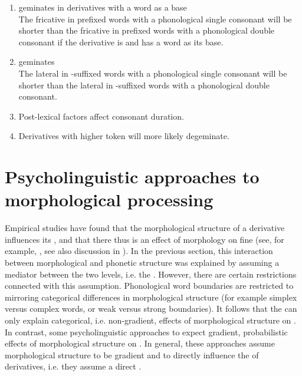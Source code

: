 \begin{description}
\begin{enumerate}[leftmargin=*]
	\item {} geminates in  derivatives with a word as a base \\
	The fricative in prefixed words with a phonological single consonant will be shorter than the fricative in prefixed words with a phonological double consonant if  the derivative is and has a word as its base.
	
	
	\item  {} geminates \\
	The lateral in -suffixed words with a phonological single consonant will be shorter than the lateral in -suffixed words with a phonological double consonant. 
	
	\item Post-lexical factors affect consonant duration.
	
	\item Derivatives with higher token  will more likely degeminate.
	
\end{enumerate}
\end{description}


\section{Psycholinguistic approaches to morphological processing} \label{Morphological Gemination: Implications for Psycholinguistic Theories of Morphological Processing}

Empirical studies have found that the morphological structure of a derivative influences its , and that there thus is an effect of morphology on fine  (see, for example, \citealt{Sproat.1993b, Cho.2001, Sugahara.2009, Pluymaekers.2010, Smith.2012, LeeKim.2013, Plag.2017}, see also discussion in ). 
In the previous section, this interaction between morphological and phonetic structure was explained by assuming a mediator between the two levels, i.e. the . However, there are certain restrictions connected with this assumption. Phonological word boundaries are restricted to mirroring categorical differences in morphological structure (for example simplex versus complex words, or weak versus strong boundaries). It follows that the  can only explain categorical, i.e. non-gradient, effects of morphological structure on . 
In contrast, some psycholinguistic approaches to  expect gradient, probabilistic effects of morphological structure on . In general, these approaches assume morphological structure to be gradient and to directly influence the  of derivatives, i.e. they assume a direct . 

